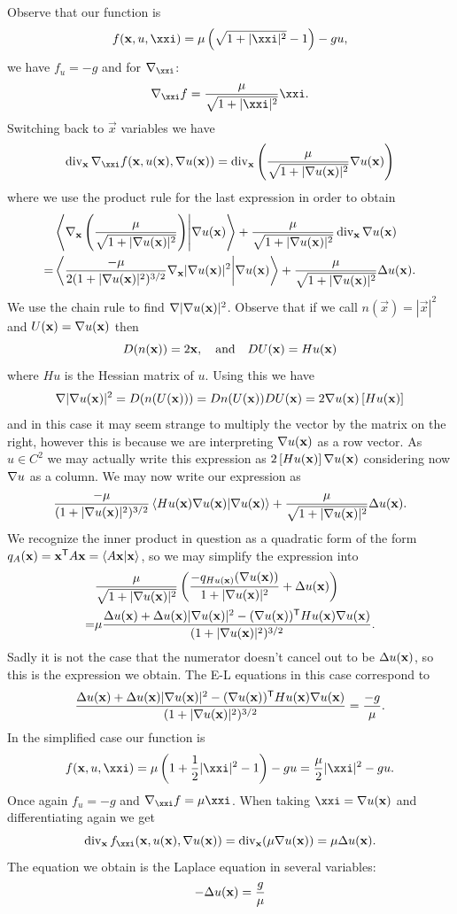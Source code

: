 \documentclass[12pt]{memoir}
\begin{document}
\begin{ptcbr}
    Observe that our function is 
    $$f(\vec x,u,\xxi)=\mu\left(\sqrt{1+|\xxi|^2}-1\right)-gu,$$
    we have $f_u=-g$ and for $\nb_\xxi$:
    $$\nb_\xxi f=\frac{\mu}{\sqrt{1+|\xxi|^2}}\xxi.$$
    Switching back to $\vec x$ variables we have 
    $$\div_{\vec x}\nb_\xxi f(\vec x,u(\vec x),\nb u(\vec x))=\div_{\vec x}\left(\frac{\mu}{\sqrt{1+|\nb u(\vec x)|^2}}\nb u(\vec x)\right)$$
    where we use the product rule for the last expression in order to obtain 
    \begin{align*}
        &\braket{\nabla_{\mathbf{x}}\left(\frac{\mu}{\sqrt{1+|\nabla u(\mathbf{x})|^2}}\right)}{\nabla u(\mathbf{x})}+\frac{\mu}{\sqrt{1+|\nabla u(\mathbf{x})|^2}}\operatorname{div}_{\mathbf{x}}\nabla u(\mathbf{x})\\
        =&\braket{\frac{-\mu}{2(1+|\nabla u(\mathbf{x})|^2)^{3/2}}\nabla_{\mathbf{x}}|\nabla u(\mathbf{x})|^2}{\nabla u(\mathbf{x})}+\frac{\mu}{\sqrt{1+|\nabla u(\mathbf{x})|^2}}\Delta u(\mathbf{x}).
    \end{align*}
    We use the chain rule to find $\nabla|\nabla u(\mathbf{x})|^2$. Observe that if we call $n(\vec{x})=|\vec x|^2$ and $U(\mathbf{x})=\nabla u(\mathbf{x})$ then 
    $$D(n(\mathbf{x}))= 2\mathbf{x},\quad\text{and}\quad DU(\mathbf{x})= Hu(\mathbf{x})$$
    where $Hu$ is the Hessian matrix of $u$. Using this we have 
    $$\nabla|\nabla u(\mathbf{x})|^2=D(n(U(\mathbf{x})))=Dn(U(\mathbf{x}))DU(\mathbf{x})=2\nabla u(\mathbf{x})\left\lbrack Hu(\mathbf{x})\right\rbrack$$
    and in this case it may seem strange to multiply the vector by the matrix on the right, however this is because we are interpreting $\nabla u(\mathbf{x})$ as a row vector. As $u\in C^2$ we may actually write this expression as $2\left\lbrack Hu(\mathbf{x})\right\rbrack\nabla u(\mathbf{x})$ considering now $\nabla u$ as a column. We may now write our expression as
    $$\frac{-\mu}{(1+|\nabla u(\mathbf{x})|^2)^{3/2}}\braket{Hu(\mathbf{x})\nabla u(\mathbf{x})}{\nabla u(\mathbf{x})}+\frac{\mu}{\sqrt{1+|\nabla u(\mathbf{x})|^2}}\Delta u(\mathbf{x}).$$
    We recognize the inner product in question as a quadratic form of the form $q_A(\mathbf{x})=\mathbf{x}^{\mathsf{T}} A\mathbf{x}=\braket{A\mathbf{x}}{\mathbf{x}}$, so we may simplify the expression into 
    \begin{align*}
        &\frac{\mu}{\sqrt{1+|\nabla u(\mathbf{x})|^2}}\left(\frac{-q_{Hu(\mathbf{x})}(\nabla u(\mathbf{x}))}{1+|\nabla u(\mathbf{x})|^2}+\Delta u(\mathbf{x})\right)\\
        =&\mu\frac{\Delta u(\mathbf{x})+\Delta u(\mathbf{x})|\nabla u(\mathbf{x})|^2-(\nabla u(\mathbf{x}))^{\mathsf{T}} Hu(\mathbf{x})\nabla u(\mathbf{x})}{(1+|\nabla u(\mathbf{x})|^2)^{3/2}}.
    \end{align*}
    Sadly it is not the case that the numerator doesn't cancel out to be $\Delta u(\mathbf{x})$, so this is the expression we obtain. The E-L equations in this case correspond to 
    $$\frac{\Delta u(\mathbf{x})+\Delta u(\mathbf{x})|\nabla u(\mathbf{x})|^2-(\nabla u(\mathbf{x}))^{\mathsf{T}} Hu(\mathbf{x})\nabla u(\mathbf{x})}{(1+|\nabla u(\mathbf{x})|^2)^{3/2}}=\frac{-g}{\mu}.$$
    In the simplified case our function is 
    $$f(\vec x,u,\xxi)=\mu\left(1+\half|\xxi|^2-1\right)-gu=\frac{\mu}{2}|\xxi|^2-gu.$$
    Once again $f_u=-g$ and $\nb_\xxi f=\mu\xxi$. When taking $\xxi =\nb u(\vec x)$ and differentiating again we get 
    $$\div_{\vec x}f_\xxi(\vec x,u(\vec x),\nb u(\vec x))=\div_{\vec x}(\mu\nb u(\vec x))=\mu\Dl u(\vec x).$$
    The equation we obtain is the Laplace equation in several variables:
    $$-\Delta u(\mathbf{x})=\frac{g}{\mu}$$

\end{ptcbr}
\end{document}
